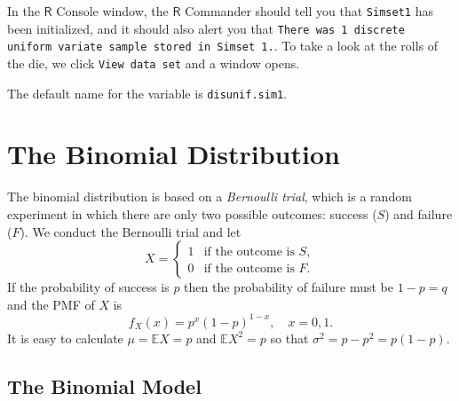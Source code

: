\documentclass[captions=tableheading]{scrbook}
\begin{document}
In the \(\mathsf{R}\) Console window, the \(\mathsf{R}\) Commander should tell you that \texttt{Simset1} has been initialized, and it should also alert you that \texttt{There was 1 discrete uniform variate sample stored in Simset 1.}. To take a look at the rolls of the die, we click \texttt{View data set} and a window opens.  

The default name for the variable is \texttt{disunif.sim1}.
\section{The Binomial Distribution}
\label{sec-5-3}
\label{sec-binom-dist}


The binomial distribution is based on a \emph{Bernoulli trial}, which is a random experiment in which there are only two possible outcomes: success (\(S\)) and failure (\(F\)). We conduct the Bernoulli trial and let 
\begin{equation}
X=
\begin{cases}
1 & \mbox{if the outcome is $S$},\\
0 & \mbox{if the outcome is $F$}.
\end{cases}
\end{equation}
If the probability of success is \(p\) then the probability of failure must be \(1-p=q\) and the PMF of \(X\) is
\begin{equation}
f_{X}(x)=p^{x}(1-p)^{1-x},\quad x=0,1.
\end{equation}
It is easy to calculate \(\mu=\mathbb{E} X=p\) and \(\mathbb{E} X^{2}=p\) so that \(\sigma^{2}=p-p^{2}=p(1-p)\).
\subsection{The Binomial Model}
\label{sec-5-3-1}
\label{sub-The-Binomial-Model}
\end{document}
